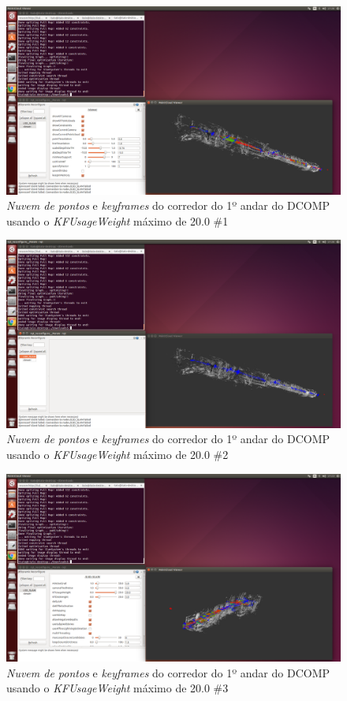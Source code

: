 \begin{figure}[H]
	\centering
		\includegraphics[width= \textwidth]{Imagens/figura3-34.png}
	\caption{\textit{Nuvem de pontos} e \textit{keyframes} do corredor do 1º andar do DCOMP usando o \textit{KFUsageWeight} máximo de 20.0 \#1}
	\label{fig3:32}
\end{figure}

\begin{figure}[H]
	\centering
		\includegraphics[width= \textwidth]{Imagens/figura3-35}
	\caption{\textit{Nuvem de pontos} e \textit{keyframes} do corredor do 1º andar do DCOMP usando o \textit{KFUsageWeight} máximo de 20.0 \#2}
	\label{fig3:33}
\end{figure}


\begin{figure}[H]
	\centering
		\includegraphics[width= \textwidth]{Imagens/figura3-36.png}
	\caption{\textit{Nuvem de pontos} e \textit{keyframes} do corredor do 1º andar do DCOMP usando o \textit{KFUsageWeight} máximo de 20.0 \#3}
	\label{fig3:34}
\end{figure}


